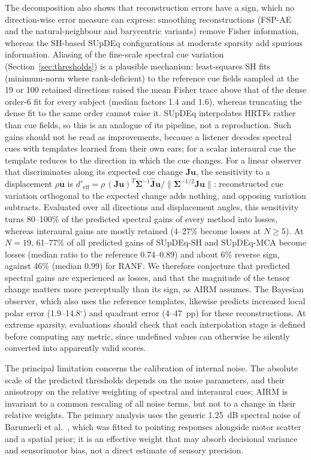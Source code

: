 \documentclass[journal]{IEEEtran}
\begin{document}
The decomposition also shows that reconstruction errors have a sign, which no direction-wise error measure can express: smoothing reconstructions (FSP-AE and the natural-neighbour and barycentric variants) remove Fisher information, whereas the SH-based SUpDEq configurations at moderate sparsity add spurious information. Aliasing of the fine-scale spectral cue variation (Section~\ref{sec:thresholds}) is a plausible mechanism: least-squares SH fits (minimum-norm where rank-deficient) to the reference cue fields sampled at the 19 or 100 retained directions raised the mean Fisher trace above that of the dense order-6 fit for every subject (median factors 1.4 and 1.6), whereas truncating the dense fit to the same order cannot raise it. SUpDEq interpolates HRTFs rather than cue fields, so this is an analogue of its pipeline, not a reproduction. Such gains should not be read as improvements, because a listener decodes spectral cues with templates learned from their own ears; for a scalar interaural cue the template reduces to the direction in which the cue changes. For a linear observer that discriminates along its expected cue change \(\mathbf J\mathbf u\), the sensitivity to a displacement \(\rho\mathbf u\) is \(d'_{\mathrm{eff}}=\rho\,(\mathbf J\mathbf u)^T\boldsymbol\Sigma^{-1}\widehat{\mathbf J}\mathbf u/\|\boldsymbol\Sigma^{-1/2}\mathbf J\mathbf u\|\): reconstructed cue variation orthogonal to the expected change adds nothing, and opposing variation subtracts. Evaluated over all directions and displacement angles, this sensitivity turns 80--100\% of the predicted spectral gains of every method into losses, whereas interaural gains are mostly retained (4--27\% become losses at \(N\ge5\)). At \(N=19\), 61--77\% of all predicted gains of SUpDEq-SH and SUpDEq-MCA become losses (median ratio to the reference 0.74--0.89) and about 6\% reverse sign, against 46\% (median 0.99) for RANF. We therefore conjecture that predicted spectral gains are experienced as losses, and that the magnitude of the tensor change matters more perceptually than its sign, as AIRM assumes. The Bayesian observer, which also uses the reference templates, likewise predicts increased local polar error (1.9--14.8\(^\circ\)) and quadrant error (4--47~pp) for these reconstructions. At extreme sparsity, evaluations should check that each interpolation stage is defined before computing any metric, since undefined values can otherwise be silently converted into apparently valid scores.

The principal limitation concerns the calibration of internal noise. The absolute scale of the predicted thresholds depends on the noise parameters, and their anisotropy on the relative weighting of spectral and interaural cues; AIRM is invariant to a common rescaling of all noise terms, but not to a change in their relative weights. The primary analysis uses the generic 1.25~dB spectral noise of Barumerli et al.~\cite{Barumerli2023}, which was fitted to pointing responses alongside motor scatter and a spatial prior; it is an effective weight that may absorb decisional variance and sensorimotor bias, not a direct estimate of sensory precision.
\end{document}
